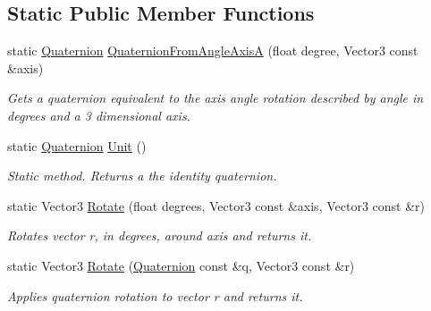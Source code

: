 \subsection*{Static Public Member Functions}
\begin{DoxyCompactItemize}
\item 
static \hyperlink{structMathUtil_1_1Quaternion}{Quaternion} \hyperlink{structMathUtil_1_1Quaternion_a63ef2f087b43c15a16f685d2a58aa25e}{Quaternion\+From\+Angle\+AxisA} (float degree, Vector3 const \&axis)
\begin{DoxyCompactList}\small\item\em Gets a quaternion equivalent to the axis angle rotation described by angle in degrees and a 3 dimensional axis. \end{DoxyCompactList}\item 
static \hyperlink{structMathUtil_1_1Quaternion}{Quaternion} \hyperlink{structMathUtil_1_1Quaternion_ae3460ce6b0259b013efb199bc5da32c9}{Unit} ()
\begin{DoxyCompactList}\small\item\em Static method. Returns a the identity quaternion. \end{DoxyCompactList}\item 
static Vector3 \hyperlink{structMathUtil_1_1Quaternion_abbc1484b797a8677a99cbe9c3947f7a9}{Rotate} (float degrees, Vector3 const \&axis, Vector3 const \&r)
\begin{DoxyCompactList}\small\item\em Rotates vector r, in degrees, around axis and returns it. \end{DoxyCompactList}\item 
static Vector3 \hyperlink{structMathUtil_1_1Quaternion_a0e7a75c2d2655616ddd505d0abfecb01}{Rotate} (\hyperlink{structMathUtil_1_1Quaternion}{Quaternion} const \&q, Vector3 const \&r)
\begin{DoxyCompactList}\small\item\em Applies quaternion rotation to vector r and returns it. \end{DoxyCompactList}\end{DoxyCompactItemize}
